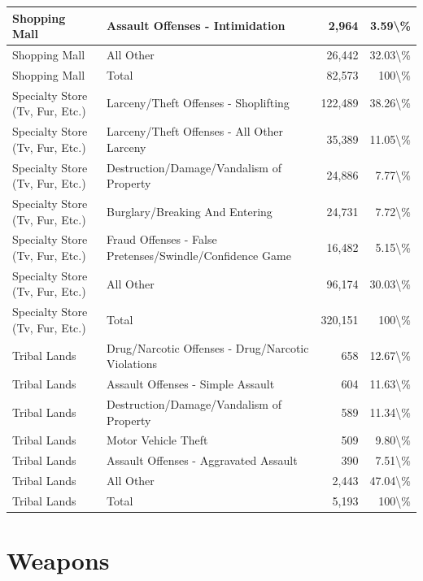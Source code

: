 \documentclass[
]{krantz}
\begin{document}
\begin{longtable}[t]{l|l|r|r}
\hline
Shopping Mall & Assault Offenses - Intimidation & 2,964 & 3.59\textbackslash{}\%\\
\hline
Shopping Mall & All Other & 26,442 & 32.03\textbackslash{}\%\\
\hline
Shopping Mall & Total & 82,573 & 100\textbackslash{}\%\\
\hline
Specialty Store (Tv, Fur, Etc.) & Larceny/Theft Offenses - Shoplifting & 122,489 & 38.26\textbackslash{}\%\\
\hline
Specialty Store (Tv, Fur, Etc.) & Larceny/Theft Offenses - All Other Larceny & 35,389 & 11.05\textbackslash{}\%\\
\hline
Specialty Store (Tv, Fur, Etc.) & Destruction/Damage/Vandalism of Property & 24,886 & 7.77\textbackslash{}\%\\
\hline
Specialty Store (Tv, Fur, Etc.) & Burglary/Breaking And Entering & 24,731 & 7.72\textbackslash{}\%\\
\hline
Specialty Store (Tv, Fur, Etc.) & Fraud Offenses - False Pretenses/Swindle/Confidence Game & 16,482 & 5.15\textbackslash{}\%\\
\hline
Specialty Store (Tv, Fur, Etc.) & All Other & 96,174 & 30.03\textbackslash{}\%\\
\hline
Specialty Store (Tv, Fur, Etc.) & Total & 320,151 & 100\textbackslash{}\%\\
\hline
Tribal Lands & Drug/Narcotic Offenses - Drug/Narcotic Violations & 658 & 12.67\textbackslash{}\%\\
\hline
Tribal Lands & Assault Offenses - Simple Assault & 604 & 11.63\textbackslash{}\%\\
\hline
Tribal Lands & Destruction/Damage/Vandalism of Property & 589 & 11.34\textbackslash{}\%\\
\hline
Tribal Lands & Motor Vehicle Theft & 509 & 9.80\textbackslash{}\%\\
\hline
Tribal Lands & Assault Offenses - Aggravated Assault & 390 & 7.51\textbackslash{}\%\\
\hline
Tribal Lands & All Other & 2,443 & 47.04\textbackslash{}\%\\
\hline
Tribal Lands & Total & 5,193 & 100\textbackslash{}\%\\
\hline
\end{longtable}

\section{Weapons}\label{offenseWeapons}
\end{document}
